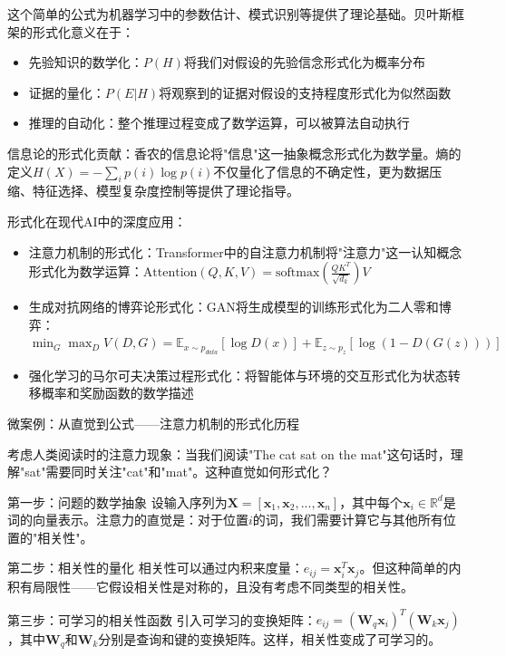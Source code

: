这个简单的公式为机器学习中的参数估计、模式识别等提供了理论基础。贝叶斯框架的形式化意义在于：

\begin{itemize}
\item 先验知识的数学化：$P(H)$将我们对假设的先验信念形式化为概率分布
\item 证据的量化：$P(E|H)$将观察到的证据对假设的支持程度形式化为似然函数  
\item 推理的自动化：整个推理过程变成了数学运算，可以被算法自动执行
\end{itemize}

信息论的形式化贡献：香农的信息论将"信息"这一抽象概念形式化为数学量。熵的定义$H(X) = -\sum_{i} p(i) \log p(i)$不仅量化了信息的不确定性，更为数据压缩、特征选择、模型复杂度控制等提供了理论指导。

形式化在现代AI中的深度应用：

\begin{itemize}
\item 注意力机制的形式化：Transformer中的自注意力机制将"注意力"这一认知概念形式化为数学运算：$\text{Attention}(Q,K,V) = \text{softmax}(\frac{QK^T}{\sqrt{d_k}})V$
\item 生成对抗网络的博弈论形式化：GAN将生成模型的训练形式化为二人零和博弈：$\min_G \max_D V(D,G) = \mathbb{E}_{x \sim p_{data}}[\log D(x)] + \mathbb{E}_{z \sim p_z}[\log(1-D(G(z)))]$
\item 强化学习的马尔可夫决策过程形式化：将智能体与环境的交互形式化为状态转移概率和奖励函数的数学描述
\end{itemize}

微案例：从直觉到公式——注意力机制的形式化历程

考虑人类阅读时的注意力现象：当我们阅读"The cat sat on the mat"这句话时，理解"sat"需要同时关注"cat"和"mat"。这种直觉如何形式化？

第一步：问题的数学抽象
设输入序列为$\mathbf{X} = [\mathbf{x}_1, \mathbf{x}_2, ..., \mathbf{x}_n]$，其中每个$\mathbf{x}_i \in \mathbb{R}^d$是词的向量表示。注意力的直觉是：对于位置$i$的词，我们需要计算它与其他所有位置的"相关性"。

第二步：相关性的量化
相关性可以通过内积来度量：$e_{ij} = \mathbf{x}_i^T \mathbf{x}_j$。但这种简单的内积有局限性——它假设相关性是对称的，且没有考虑不同类型的相关性。

第三步：可学习的相关性函数
引入可学习的变换矩阵：$e_{ij} = (\mathbf{W}_q \mathbf{x}_i)^T (\mathbf{W}_k \mathbf{x}_j)$，其中$\mathbf{W}_q$和$\mathbf{W}_k$分别是查询和键的变换矩阵。这样，相关性变成了可学习的。

